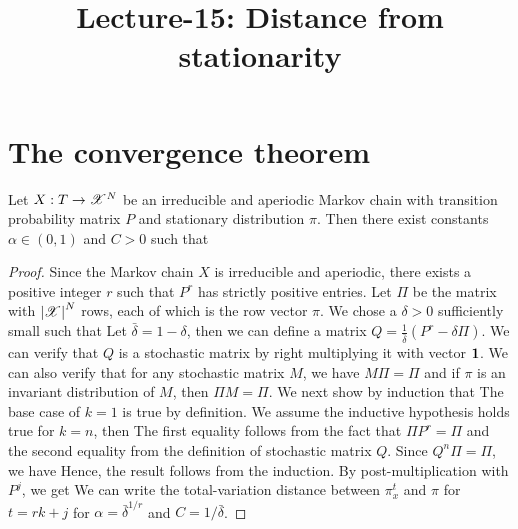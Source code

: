 \documentclass[letterpaper,english,10pt]{article}
\title{Lecture-15: Distance from stationarity}
\begin{document}
\maketitle

\section{The convergence theorem}
\begin{thm} 
Let $X: T \to \mathscr{X}^N$ be an irreducible and aperiodic Markov chain with transition probability matrix $P$ and stationary distribution $\pi$. 
Then there exist constants $\alpha \in (0,1)$ and $C > 0$ such that
\end{thm}
\begin{proof}
Since the Markov chain $X$ is irreducible and aperiodic, 
there exists a positive integer $r$ such that $P^r$ has strictly positive entries. 
Let $\Pi$ be the matrix with $\left\lvert\mathscr{X}\right\rvert^N$ rows, 
each of which is the row vector $\pi$. 
We chose a $\delta > 0$  sufficiently small such that 
Let $\bar{\delta} = 1-\delta$, then we can define a matrix $Q = \frac{1}{\bar{\delta}}(P^r- \delta\Pi)$. 
We can verify that $Q$ is a stochastic matrix by right multiplying it with vector $\mathbf{1}$. 
We can also verify that for any stochastic matrix $M$, we have $M\Pi = \Pi$ and if $\pi$ is an invariant distribution of $M$, then $\Pi M = \Pi$. 
We next show by induction that 
The base case of $k=1$ is true by definition. 
We assume the inductive hypothesis holds true for $k =n$,  then
The first equality follows from the fact that $\Pi P^r = \Pi$ and the second equality from the definition of stochastic matrix $Q$. 
Since $Q^n\Pi = \Pi$, we have 
Hence, the result follows from the induction. 
By post-multiplication with $P^j$, we get 
We can write the total-variation distance between $\pi^{t}_x$ and $\pi$ for $t=rk+j$
for $\alpha = \bar{\delta}^{1/r}$ and $C = 1/\bar{\delta}$. 
\end{proof}
\end{document}
